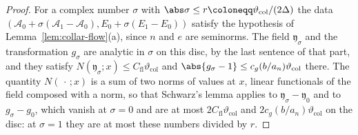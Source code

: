 \begin{proof}
For a complex number $\sigma$ with $\abs\sigma \leq r \coloneqq \vartheta_{\mathrm{col}}/(2\Delta)$ the data $(\mathcal A_0 + \sigma(\mathcal A_1 - \mathcal A_0), E_0 + \sigma(E_1 - E_0))$ satisfy the hypothesis of Lemma~\ref{lem:collar-flow}(a), since $n$ and $e$ are seminorms. The field $\mathfrak y_\sigma$ and the transformation $g_\sigma$ are analytic in $\sigma$ on this disc, by the last sentence of that part, and they satisfy $N(\mathfrak y_\sigma; x) \leq C_{\mathrm{fl}}\vartheta_{\mathrm{col}}$ and $\abs{g_\sigma - 1} \leq c_g(b/a_n)\vartheta_{\mathrm{col}}$ there. The quantity $N(\,\cdot\,; x)$ is a sum of two norms of values at $x$, linear functionals of the field composed with a norm, so that Schwarz's lemma applies to $\mathfrak y_\sigma - \mathfrak y_0$ and to $g_\sigma - g_0$, which vanish at $\sigma = 0$ and are at most $2C_{\mathrm{fl}}\vartheta_{\mathrm{col}}$ and $2c_g(b/a_n)\vartheta_{\mathrm{col}}$ on the disc: at $\sigma = 1$ they are at most these numbers divided by $r$.
\end{proof}


